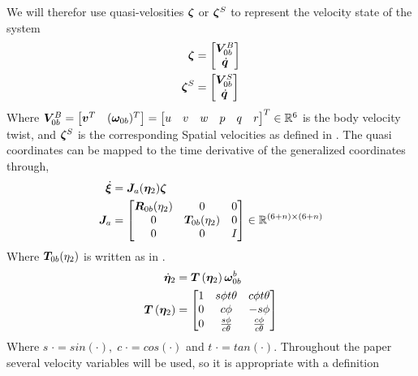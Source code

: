 We will therefor use quasi-velosities $ \boldsymbol \zeta $ or $\boldsymbol \zeta^S$ to represent the velocity state of the system
\begin{align}
  \boldsymbol \zeta &= \begin{bmatrix} \boldsymbol V_{0b}^B \\ \dot{\boldsymbol q} \end{bmatrix}
  \label{eq:zeta1}
	\\
	\boldsymbol \zeta^S &= \begin{bmatrix} \boldsymbol V_{0b}^S \\ \dot{\boldsymbol q} \end{bmatrix}
	\label{eq:zetas}
\end{align}
Where $\boldsymbol V_{0b}^B = \begin{bmatrix} \boldsymbol v^{T} & ( \boldsymbol \omega_{0b}  )^{T} \end{bmatrix}=  \begin{bmatrix} u & v & w & p & q & r \end{bmatrix}^T \in \mathbb{R}^6 $ is the body velocity twist, and $\boldsymbol \zeta^S$ is the corresponding Spatial velocities as defined in \cite{kristin_jant}. The quasi coordinates can be mapped to the time derivative of the generalized coordinates through, \cite{kristin_jant} 
\begin{align}
 	\dot{\boldsymbol \xi} &=\boldsymbol J_a(\boldsymbol \eta_2)\boldsymbol \zeta 
  \label{eq:quasi_trans}
  \\
  \boldsymbol J_a &= \begin{bmatrix} \boldsymbol R_{0b}(\eta_2) & 0& 0 \\ 0 & \boldsymbol T_{0b}(\eta_2) & 0 \\ 0 & 0 & I \end{bmatrix} \in \mathbb{R}^{(6+n) \times (6+n) }
  \label{eq:jacobian_a}
\end{align}
Where $\boldsymbol T_{0b}(\eta_2)$ is written as in \cite{fs}.
\begin{align}
	\dot{\boldsymbol \eta}_2 & = \boldsymbol T\left( \boldsymbol \eta_{2} \right) \boldsymbol \omega_{0b}^{b} \\
	\boldsymbol T\left( \boldsymbol \eta_{2} \right) &= 
		\begin{bmatrix} 1 & s\phi t\theta & c\phi t\theta \\
										0 & c\phi & -s\phi \\
										0 & \frac{s\phi}{c\theta} & \frac{c\phi}{c\theta}
	\end{bmatrix}
	\label{eeq:fossen-transfomrm}
\end{align}
Where $s \; \cdot = sin(\cdot ), \; c \; \cdot = cos(\cdot)$ and $t \; \cdot = tan(\cdot)$. Throughout the paper several velocity variables will be used, so it is appropriate with a definition


